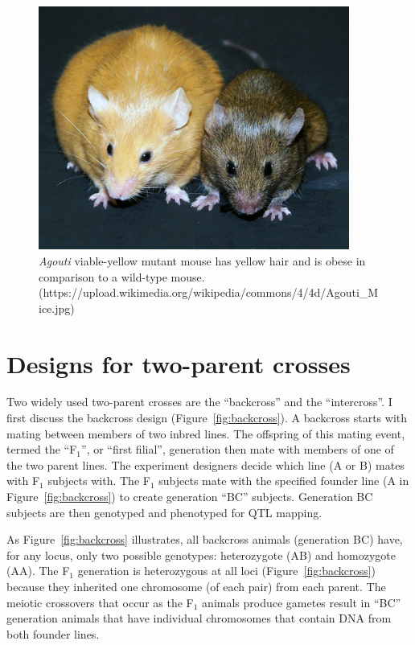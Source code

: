 \documentclass[oneside]{book}\usepackage[]{graphicx}\usepackage[]{color}
\begin{document}
\begin{figure}
\includegraphics[height=8cm]{figs/Agouti.jpg}
\caption{\emph{Agouti} viable-yellow mutant mouse has yellow hair and is obese in comparison to a wild-type mouse. (https://upload.wikimedia.org/wikipedia/commons/4/4d/Agouti\_Mice.jpg)}
\label{fig:agouti}
\end{figure}






\section{Designs for two-parent crosses}\label{sec:two-parent-designs}

Two widely used two-parent crosses are the ``backcross'' and the
``intercross''. I first discuss the backcross design
(Figure~\ref{fig:backcross}). A backcross starts with mating between
members of two inbred lines. The offspring of this mating event,
termed the ``F$_1$'', or ``first filial'', generation then mate
with members of one of the two parent lines. The experiment designers
decide which line (A or B) mates with F$_1$ subjects
with. The F$_1$ subjects mate with the specified founder line 
(A in Figure~\ref{fig:backcross}) to create generation ``BC'' subjects. 
Generation BC subjects are then genotyped and phenotyped for QTL mapping. 



As Figure~\ref{fig:backcross} illustrates, all backcross animals (generation
BC) have, for any locus, only two possible genotypes: heterozygote (AB)
and homozygote (AA).
The F$_1$ generation is heterozygous at all loci (Figure~\ref{fig:backcross}) because 
they inherited one chromosome (of each pair) from each parent.
The meiotic crossovers that occur as the F$_1$ animals produce gametes result in ``BC'' generation animals that have individual
chromosomes that contain DNA from both founder lines. 
\end{document}
